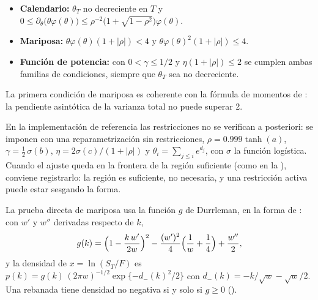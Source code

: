 \begin{itemize}
\item \textbf{Calendario:} $\theta_T$ no decreciente en $T$ y
$0\le\partial_\theta\bigl(\theta\varphi(\theta)\bigr)\le\rho^{-2}\bigl(1+\sqrt{1-\rho^2}\bigr)\varphi(\theta)$.
\item \textbf{Mariposa:} $\theta\varphi(\theta)(1+|\rho|)<4$ y $\theta\varphi(\theta)^2(1+|\rho|)\le 4$.
\item \textbf{Función de potencia:} con $0<\gamma\le 1/2$ y $\eta(1+|\rho|)\le 2$ se cumplen ambas familias
de condiciones, siempre que $\theta_T$ sea no decreciente.
\end{itemize}

La primera condición de mariposa es coherente con la fórmula de momentos de \citet{lee2004}: la pendiente
asintótica de la varianza total no puede superar 2.

\begin{notatecnica}
En la implementación de referencia las restricciones no se verifican a posteriori: se imponen con una
reparametrización sin restricciones, $\rho=0.999\tanh(a)$, $\gamma=\tfrac12\,\sigma(b)$,
$\eta=2\sigma(c)/(1+|\rho|)$ y $\theta_i=\sum_{j\le i}e^{d_j}$, con $\sigma$ la función logística. Cuando
el ajuste queda en la frontera de la región suficiente (como en la ), conviene
registrarlo: la región es suficiente, no necesaria, y una restricción activa puede estar sesgando la
forma.
\end{notatecnica}



La prueba directa de mariposa usa la función $g$ de Durrleman, en la forma de \citet{gatheral2014}:
con $w'$ y $w''$ derivadas respecto de $k$,
\begin{equation}
g(k)=\Bigl(1-\frac{k\,w'}{2w}\Bigr)^2-\frac{(w')^2}{4}\Bigl(\frac1w+\frac14\Bigr)+\frac{w''}{2},
\label{eq:g}
\end{equation}
y la densidad de $x=\ln(S_T/F)$ es $p(k)=g(k)\,(2\pi w)^{-1/2}\exp\{-d_-(k)^2/2\}$ con
$d_-(k)=-k/\sqrt{w}-\sqrt{w}/2$. Una rebanada tiene densidad no negativa si y solo si $g\ge 0$
().

